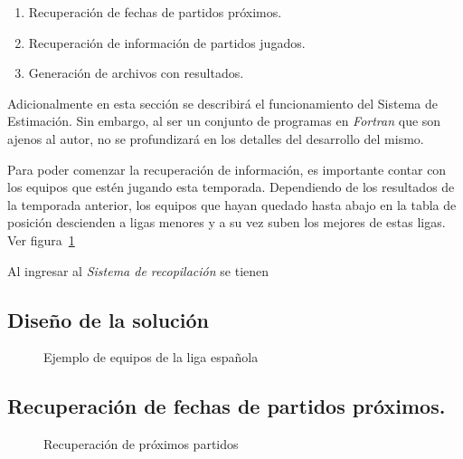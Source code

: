 \begin{enumerate}
	\item Recuperación de fechas de partidos próximos.
	\item Recuperación de información de partidos jugados.
	\item Generación de archivos con resultados.
\end{enumerate}


Adicionalmente en esta sección se describirá el funcionamiento del Sistema de Estimación. Sin embargo, al ser un conjunto de programas en \emph{Fortran} que son ajenos al autor, no se profundizará en los detalles del desarrollo del mismo.

Para poder comenzar la recuperación de información, es importante contar con los equipos que estén jugando esta temporada. Dependiendo de los resultados de la temporada anterior, los equipos que hayan quedado hasta abajo en la tabla de posición descienden a ligas menores y a su vez suben los mejores de estas ligas. Ver figura~\ref{Fig:los-equipos}

Al ingresar al \emph{Sistema de recopilación} se tienen 
\subsection{Diseño de la solución}
\cite{alfredo2005ingenieria}


\begin{figure}[!htb]\centering
   \begin {minipage}{1\textwidth}
     \caption[Ejemplo de equipos de la liga española]{Ejemplo de equipos de la liga española\footnotemark }\label{Fig:los-equipos}
   \end{minipage}
\end{figure}


\subsection{Recuperación de fechas de partidos próximos.}

\begin{figure}[!htb]\centering
   \begin {minipage}{1\textwidth}
     \caption{Recuperación de próximos partidos}\label{Fig:proximos-partidos}
   \end{minipage}
\end{figure}

